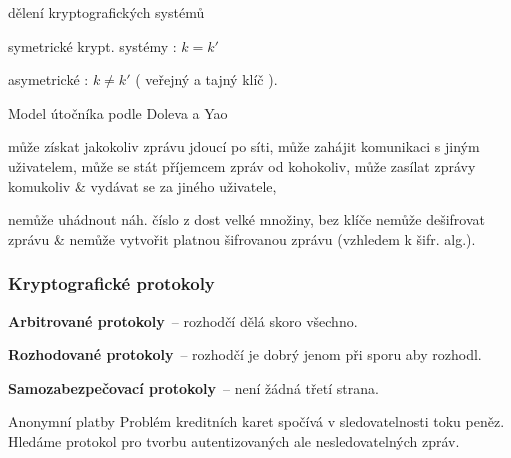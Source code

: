 \begin{obecne}{dělení kryptografických systémů}
\begin{pitemize}
    \item symetrické krypt. systémy : $k = k'$
    \item asymetrické : $k \neq k'$ ( veřejný a tajný klíč ). 
\end{pitemize}
\end{obecne}

\begin{obecne}{Model útočníka podle Doleva a Yao}
\begin{pitemize}
    \item může získat jakokoliv zprávu jdoucí po síti, může zahájit komunikaci s jiným uživatelem, může se stát příjemcem zpráv od kohokoliv, může zasílat zprávy komukoliv \& vydávat se za jiného uživatele, 
    \item nemůže uhádnout náh. číslo z dost velké množiny, bez klíče nemůže dešifrovat zprávu \& nemůže vytvořit platnou šifrovanou zprávu (vzhledem k šifr. alg.).
\end{pitemize}
\end{obecne}

\subsubsection*{Kryptografické protokoly}

\begin{pitemize}
   \item \textbf{Arbitrované protokoly}~-- rozhodčí dělá skoro všechno.
   \item \textbf{Rozhodované protokoly}~-- rozhodčí je dobrý jenom při sporu aby rozhodl.
   \item \textbf{Samozabezpečovací protokoly}~-- není žádná třetí strana.
\end{pitemize}

\begin{obecne}{Anonymní platby}
  Problém kreditních karet spočívá v sledovatelnosti toku peněz. Hledáme protokol
  pro tvorbu autentizovaných ale nesledovatelných zpráv.
\end{obecne}

